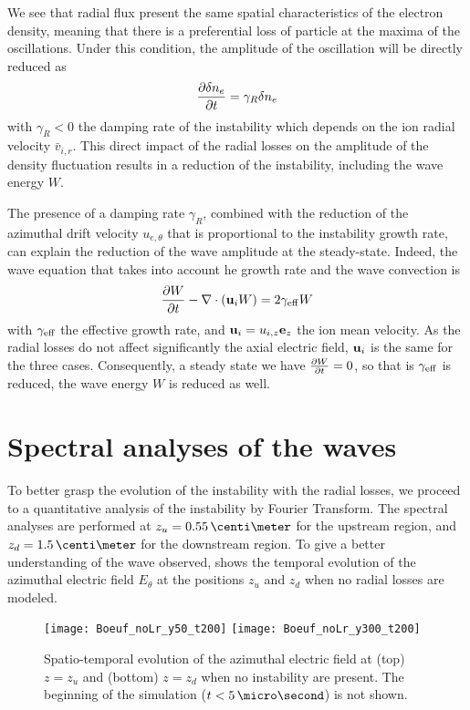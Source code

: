   We see that radial flux present the same spatial characteristics of the electron density, meaning that there is a preferential loss of particle at the maxima of the oscillations.
  Under this condition, the amplitude of the oscillation will be directly reduced as
  \[ \frac{\partial \delta n_e}{\partial t} =  \gamma_R \delta n_e \]
  with $\gamma_R < 0$ the damping rate of the instability which depends on the ion radial velocity $ \bar{v}_{i, r}$.
  This direct impact of the radial losses on the amplitude of the density fluctuation results in a reduction of the instability, including the wave energy $W$.
  
  \vspace{1em}
  The presence of a damping rate $\gamma_R$, combined with the reduction of the azimuthal drift velocity $u_{e, \theta}$ that is proportional to the instability growth rate, can explain the reduction of the wave amplitude at the steady-state.
  Indeed, the wave equation that takes into account he growth rate and the wave convection is \citep{martorelli2019}
  \begin{equation} \label{eq-wequation}
    \frac{\partial W}{\partial t} - \nabla \cdot ({\mathbf u_i} W) = 2 \gamma_{\rm eff} W
  \end{equation}
  with $\gamma_{\rm eff}$ the effective growth rate, and ${\mathbf u_i} =u_{i, z} {\mathbf e_z}$  the ion mean velocity.
  As the radial losses do not affect significantly the axial electric field, ${\mathbf u_i}$ is the same for the three cases.
  Consequently, a steady state we have $\frac{\partial W}{\partial t}=0$, so that is $\gamma_{\rm eff}$ is reduced, the wave energy $W$ is reduced as well.

  \FloatBarrier

\section{Spectral analyses of the waves} \label{subsec-fft}

  To better grasp the evolution of the instability with the radial losses, we proceed to a quantitative analysis of the instability by Fourier Transform.
  The spectral analyses are performed at $z_u=0.55\,\centi\meter$ for the upstream region, and $z_d=1.5\,\centi\meter$ for the downstream region.
  To give a better understanding of the wave observed,  shows the temporal evolution of the azimuthal electric field $E_{\theta}$  at the positions $z_u$ and $z_d$ when no radial losses are modeled.

  \begin{figure}[!hbt]
    \centering
    \texttt{[image: Boeuf\_noLr\_y50\_t200]}
    \texttt{[image: Boeuf\_noLr\_y300\_t200]}
    \caption{Spatio-temporal evolution of the azimuthal electric field at (top) $z=z_u$ and (bottom) $z=z_d$ when no instability are present. The beginning of the simulation ($t<5\,\micro\second$) is not shown. }
    \label{fig-cut2D}
  \end{figure}


